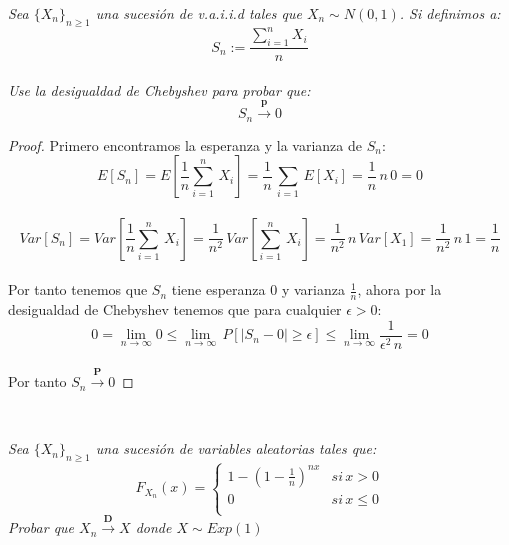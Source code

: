 \documentclass[11pt]{article}
\begin{document}
\begin{tcolorbox}[
	title = \textcolor{black}{\textcolor{white}{Problema 2}},]
\textit{Sea $\{X_n\}_{n\geq 1}$ una sucesi\'on de v.a.i.i.d tales que $X_n\sim N(0,1)$. Si definimos a:
\begin{equation*}
    S_n:=\frac{\sum_{i=1}^n X_i}{n}
\end{equation*}\,\\
Use la desigualdad de Chebyshev para probar que:\,\\
\begin{equation*}
    S_n\xrightarrow{\textbf{p}} 0
\end{equation*}
}
\end{tcolorbox}
\begin{proof}
    Primero encontramos la esperanza y la varianza de $S_n$:\,\\
    \begin{equation*}
        E[S_n]=E\left[\frac{1}{n}\sum_{i=1}^n\,X_i\right]=\frac{1}{n}\,\sum_{i=1}\,E[X_i]=\frac{1}{n}\,n\,0=0
    \end{equation*}\,\\
    \begin{equation*}
        Var[S_n]=Var\left[\frac{1}{n}\sum_{i=1}^n\,X_i\right]=\frac{1}{n^2}\,Var\left[\sum_{i=1}^n\,X_i\right]=\frac{1}{n^2}\,n\,Var[X_1]=\frac{1}{n^2}\,n\,1=\frac{1}{n}
    \end{equation*}\,\\
    Por tanto tenemos que $S_n$ tiene esperanza $0$ y varianza $\frac{1}{n}$, ahora por la desigualdad de Chebyshev tenemos que para cualquier $\epsilon>0$:
    \,\\
    \begin{equation*}
       0=\lim_{n\rightarrow \infty}0\leq \lim_{n\rightarrow \infty}\,P[|S_n-0|\geq \epsilon]\leq \lim_{n\rightarrow \infty}\frac{1}{\epsilon^2\,n}=0
    \end{equation*}\,\\
    Por tanto $S_n\xrightarrow{\textbf{P}}0$
\end{proof}
\,\\
\begin{tcolorbox}[
	title = \textcolor{black}{\textcolor{white}{Problema 3}},]
\textit{Sea $\{X_n\}_{n\geq 1}$ una sucesi\'on de variables aleatorias tales que:
\[
F_{X_n}(x) =
\begin{cases}
1-\left(1-\frac{1}{n}\right)^{nx}& si\,x>0\\
0& si\,x\leq 0\\
\end{cases}\]
Probar que $X_n\xrightarrow{\textbf{D}} X$ donde $X\sim Exp(1)$
}
\end{tcolorbox}
\end{document}
